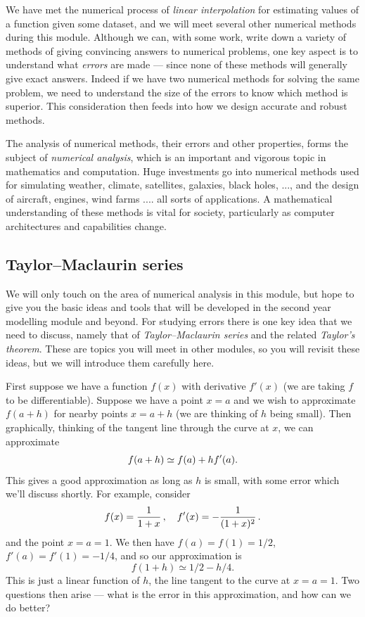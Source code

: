We have met the numerical process of \emph{linear interpolation} for estimating values of a function given 
some dataset, and we will meet several other numerical methods during this module. Although we can, with
some work, write down a variety of methods of giving convincing answers to numerical problems, one key aspect
is to understand what \emph{errors} are made --- since none of these methods will generally give exact answers. Indeed
if we have two numerical methods for solving the same problem, we need to understand the size of the errors to know
which method is superior. This consideration then feeds into how we design accurate and robust methods.

The analysis of numerical methods, their errors and other properties, forms the subject of \emph{numerical analysis}, 
which is an important and vigorous topic in mathematics and computation. Huge investments go into numerical methods used 
for simulating weather, climate, satellites, galaxies, black holes, ..., and the design of aircraft, engines, wind farms .... all sorts of applications. 
A mathematical understanding of these methods is vital for society, particularly as computer architectures and capabilities change. 

\subsection{Taylor--Maclaurin series} 

We will only touch on the area of numerical analysis in this module, but hope to give you the basic ideas and tools that 
will be developed in the second year modelling module and beyond. For studying errors there is one key idea that we 
need to discuss, namely that of \emph{Taylor--Maclaurin series} and the related \emph{Taylor's theorem}. These are topics you will meet
in other modules, so you will revisit these ideas, but we will introduce them carefully here. 

First suppose we have a function $f(x)$ with derivative $f'(x)$ (we are taking $f$ to be differentiable). Suppose
we have a point $x=a$ and we wish to approximate $f(a+h)$ for nearby points $x = a+h$ (we are thinking of $h$ being small). 
Then graphically, thinking of the tangent line through the curve at $x$, we can approximate 
%
\begin{equation}
f(a+h)  \simeq f(a) + h f'(a).
\notag
\end{equation}
%
This gives a good approximation as long as $h$ is small, with some error which we'll discuss shortly. For example, consider
%
\begin{equation}
f(x) = \frac{1}{1+x}\, , \quad f'(x) = - \frac{1}{(1+x)^2} \, . 
\notag
\end{equation}
%
and the point $ x = a = 1$. We then have  $f(a) = f(1) = 1/2$, $f'(a) = f'(1) = - 1/4$, and so our approximation is 
\begin{equation}
f(1+h)  \simeq  1/2  - h / 4 . 
\nonumber
\end{equation}
%
This is just a linear function of $h$, the line tangent to the curve at $x=a=1$. Two questions then arise --- what is the error 
in this approximation, and how can we do better? 

